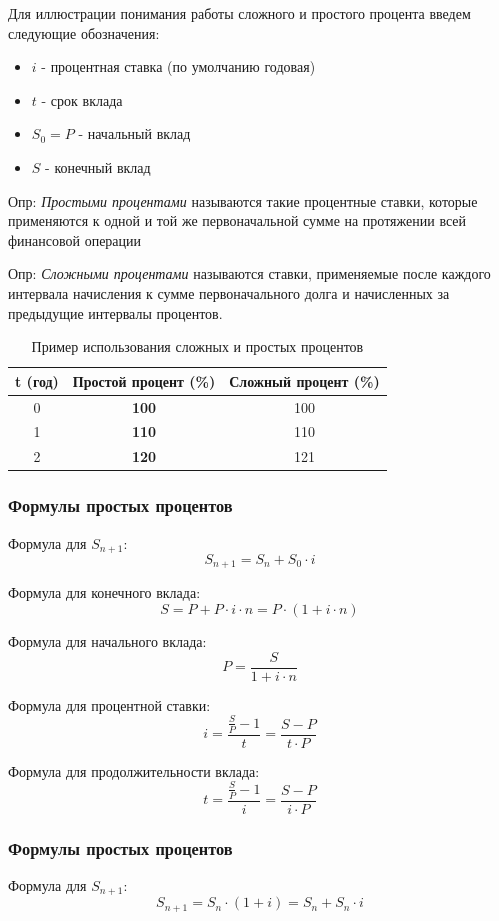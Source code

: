 \documentclass[aps,%
12pt,%
final,%
oneside,
onecolumn,%
musixtex, %
superscriptaddress,%
centertags]{article} %
\begin{document}
Для иллюстрации понимания работы сложного и простого процента введем следующие обозначения:
\begin{itemize} 
  \item $i$ - процентная ставка (по умолчанию годовая)
  \item $t$ - срок вклада
  \item $S_{0} = P$ - начальный вклад
  \item \textbf{$S$} - конечный вклад
  
\end{itemize}

Опр: \textit{Простыми процентами} называются такие процентные ставки, которые применяются к одной и той же первоначальной сумме на протяжении всей финансовой операции

Опр: \textit{Сложными процентами} называются ставки, применяемые после каждого интервала начисления к сумме первоначального долга и начисленных за предыдущие интервалы процентов.
\label{first_table}
\begin{table}[H]
	\begin{center}
		\begin{tabular}{c|c|c} 
		t (год) & Простой процент (\%) & Сложный процент (\%) \\ \hline
		0 & \textbf{100} & 100  \\ 
		1 & \textbf{110} & 110 \\ 
		2 & \textbf{120} & 121
		\end{tabular}
	\caption{Пример использования сложных и простых процентов}
	\end{center}
\end{table}
\subsubsection{Формулы простых процентов}
Формула для $S_{n+1}$: $$S_{n+1}=S_n+S_0\cdot i  $$

Формула для конечного вклада: $$S=P+P\cdot i\cdot n=P\cdot (1+i\cdot n) $$

Формула для начального вклада: $$P=\frac{S}{1+i\cdot n} $$

Формула для процентной ставки: $$i=\frac{\frac{S}{P}-1}{t}=\frac{S-P}{t\cdot P}$$

Формула для продолжительности вклада: $$ t=\frac{\frac{S}{P}-1}{i}=\frac{S-P}{i\cdot P}$$

\subsubsection{Формулы простых процентов}
Формула для $S_{n+1}$: $$S_{n+1}=S_n\cdot (1+i) = S_n + S_n\cdot i  $$
\end{document}
